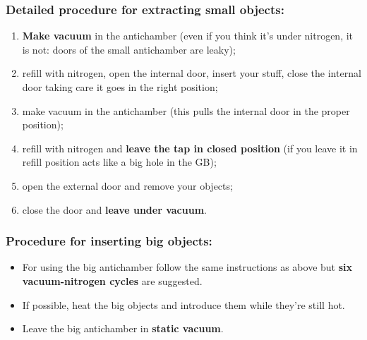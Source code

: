\documentclass[a4paper,15pt]{scrartcl}
\begin{document}
\subsubsection*{Detailed procedure for extracting small objects:}
\begin{enumerate}
	\item     \textbf{Make vacuum} in the antichamber (even if you think it's under nitrogen, it is not: doors of the small antichamber are leaky);
	\item     refill with nitrogen, open the internal door, insert your stuff, close the internal door taking care it goes in the right position;
	\item     make vacuum in the antichamber (this pulls the internal door in the proper position);
	\item     refill with nitrogen and \textbf{leave the tap in closed position} (if you leave it in refill position acts like a big hole in the GB);
	\item     open the external door and remove your objects;
	\item     close the door and \textbf{leave under vacuum}.
\end{enumerate}

\subsubsection*{Procedure for inserting big objects:}
\begin{itemize}
	\item     For using the big antichamber follow the same instructions as above but \textbf{six vacuum-nitrogen cycles} are suggested.
	\item     If possible, heat the big objects and introduce them while they're still hot.
	\item     Leave the big antichamber in \textbf{static vacuum}.
\end{itemize}
\end{document}
